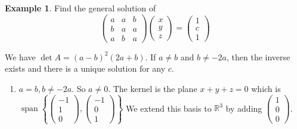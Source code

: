 \documentclass[a4paper]{article}
\theoremstyle{definition}
\newtheorem*{eg}{Example}
\newcommand{\R}{\mathbb{R}}
\DeclareMathOperator\spn{span}
\begin{document}
\begin{eg}
  Find the general solution of
  \[
  \begin{pmatrix}
    a & a & b\\
    b & a & a\\
    a & b & a
  \end{pmatrix}
  \begin{pmatrix}
    x\\y\\z
  \end{pmatrix}
  =\begin{pmatrix}
   1\\c\\1
  \end{pmatrix}
  \]

  We have $\det A = (a - b)^2 (2a + b)$. If $a \not= b$ and $b \not= -2a$, then the inverse exists and there is a unique solution for any $c$.
  \begin{enumerate}
  \item $a = b, b \not= -2a$. So $a\not= 0$. The kernel is the plane $x + y + z = 0$ which is $\spn\left\{
    \begin{pmatrix}
      -1\\1\\0
    \end{pmatrix},
    \begin{pmatrix}
      -1\\ 0\\ 1
    \end{pmatrix}\right\}$
    We extend this basis to $\R^3$ by adding $
    \begin{pmatrix}
      1\\0\\0
    \end{pmatrix}$.


\end{enumerate}
\end{eg}
\end{document}
